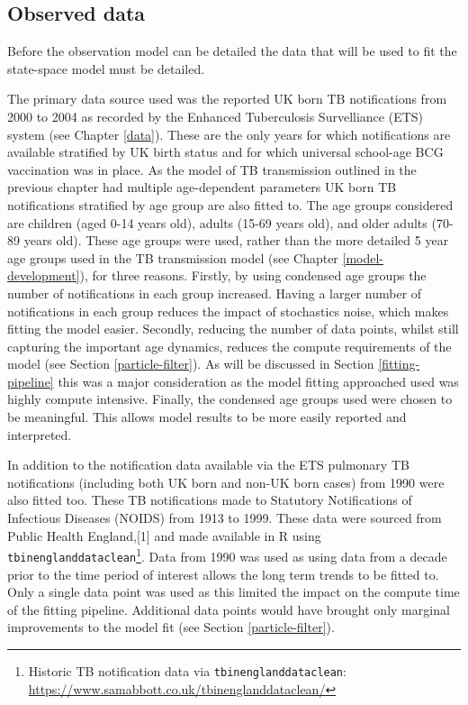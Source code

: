 \documentclass[11pt,twoside]{bristolthesis}
\begin{document}
  \hypertarget{observed-data}{%
  \subsection{Observed data}\label{observed-data}}
  
  Before the observation model can be detailed the data that will be used to fit the state-space model must be detailed.
  
  The primary data source used was the reported UK born TB notifications from 2000 to 2004 as recorded by the Enhanced Tuberculosis Survelliance (ETS) system (see Chapter \ref{data}). These are the only years for which notifications are available stratified by UK birth status and for which universal school-age BCG vaccination was in place. As the model of TB transmission outlined in the previous chapter had multiple age-dependent parameters UK born TB notifications stratified by age group are also fitted to. The age groups considered are children (aged 0-14 years old), adults (15-69 years old), and older adults (70-89 years old). These age groups were used, rather than the more detailed 5 year age groups used in the TB transmission model (see Chapter \ref{model-development}), for three reasons. Firstly, by using condensed age groups the number of notifications in each group increased. Having a larger number of notifications in each group reduces the impact of stochastics noise, which makes fitting the model easier. Secondly, reducing the number of data points, whilst still capturing the important age dynamics, reduces the compute requirements of the model (see Section \ref{particle-filter}). As will be discussed in Section \ref{fitting-pipeline} this was a major consideration as the model fitting approached used was highly compute intensive. Finally, the condensed age groups used were chosen to be meaningful. This allows model results to be more easily reported and interpreted.
  
  In addition to the notification data available via the ETS pulmonary TB notifications (including both UK born and non-UK born cases) from 1990 were also fitted too. These TB notifications made to Statutory Notifications of Infectious Diseases (NOIDS) from 1913 to 1999. These data were sourced from Public Health England,{[}1{]} and made available in R using \texttt{tbinenglanddataclean}\footnote{Historic TB notification data via \texttt{tbinenglanddataclean}: \url{https://www.samabbott.co.uk/tbinenglanddataclean/}}. Data from 1990 was used as using data from a decade prior to the time period of interest allows the long term trends to be fitted to. Only a single data point was used as this limited the impact on the compute time of the fitting pipeline. Additional data points would have brought only marginal improvements to the model fit (see Section \ref{particle-filter}).
  
\end{document}
